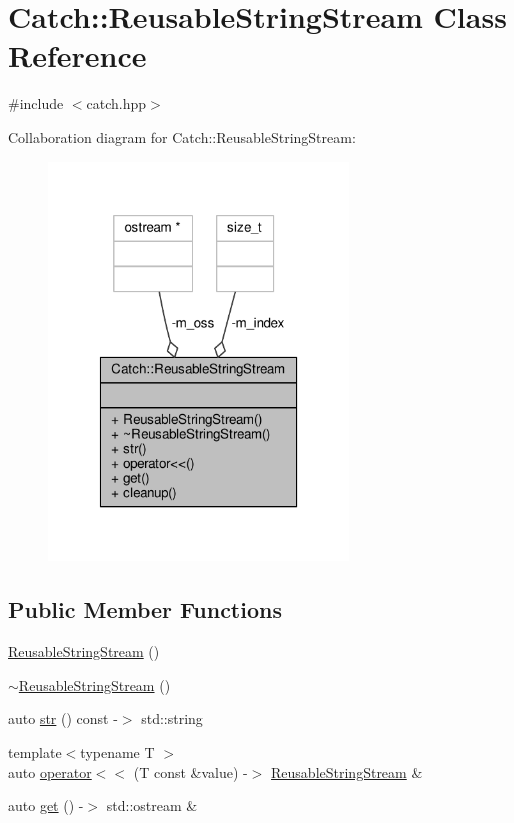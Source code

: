 \hypertarget{class_catch_1_1_reusable_string_stream}{\section{Catch\-:\-:Reusable\-String\-Stream Class Reference}
\label{class_catch_1_1_reusable_string_stream}
}


{\ttfamily \#include $<$catch.\-hpp$>$}



Collaboration diagram for Catch\-:\-:Reusable\-String\-Stream\-:
\nopagebreak
\begin{figure}[H]
\begin{center}
\leavevmode
\includegraphics[width=226pt]{class_catch_1_1_reusable_string_stream__coll__graph}
\end{center}
\end{figure}
\subsection*{Public Member Functions}
\begin{DoxyCompactItemize}
\item 
\hyperlink{class_catch_1_1_reusable_string_stream_a9b3f8c52b0d2d63ffd825297a9c09781}{Reusable\-String\-Stream} ()
\item 
\hyperlink{class_catch_1_1_reusable_string_stream_aba9384e258a4db3178447b6a58414712}{$\sim$\-Reusable\-String\-Stream} ()
\item 
auto \hyperlink{class_catch_1_1_reusable_string_stream_a0e9ecf260b2a5d35f4886ef0d51f6270}{str} () const -\/$>$ std\-::string
\item 
{\footnotesize template$<$typename T $>$ }\\auto \hyperlink{class_catch_1_1_reusable_string_stream_af95f72024c082db70e5e50782e28e4f6}{operator$<$$<$} (T const \&value) -\/$>$ \hyperlink{class_catch_1_1_reusable_string_stream}{Reusable\-String\-Stream} \&
\item 
auto \hyperlink{class_catch_1_1_reusable_string_stream_a6881808c60a080d4e24a0b81c94cbf67}{get} () -\/$>$ std\-::ostream \&
\end{DoxyCompactItemize}
